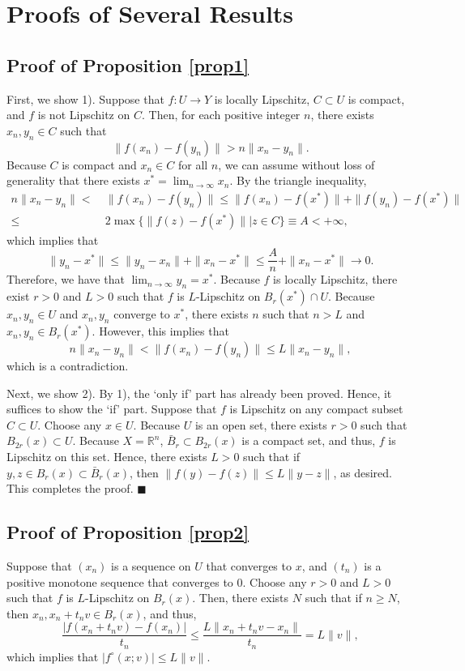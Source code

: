 \documentclass[a4paper,12pt]{article}
\theoremstyle{definition}
\begin{document}
\appendix
\section{Proofs of Several Results}


\subsection{Proof of Proposition \ref{prop1}}
First, we show 1). Suppose that $f:U\to Y$ is locally Lipschitz, $C\subset U$ is compact, and $f$ is not Lipschitz on $C$. Then, for each positive integer $n$, there exists $x_n,y_n\in C$ such that
\[\|f(x_n)-f(y_n)\|>n\|x_n-y_n\|.\]
Because $C$ is compact and $x_n\in C$ for all $n$, we can assume without loss of generality that there exists $x^*=\lim_{n\to \infty}x_n$. By the triangle inequality,
\begin{align*}
n\|x_n-y_n\|<&~\|f(x_n)-f(y_n)\|\le \|f(x_n)-f(x^*)\|+\|f(y_n)-f(x^*)\|\\
\le&~2\max\{\|f(z)-f(x^*)\||z\in C\}\equiv A<+\infty,
\end{align*}
which implies that
\[\|y_n-x^*\|\le \|y_n-x_n\|+\|x_n-x^*\|\le \frac{A}{n}+\|x_n-x^*\|\to 0.\]
Therefore, we have that $\lim_{n\to \infty}y_n=x^*$. Because $f$ is locally Lipschitz, there exist $r>0$ and $L>0$ such that $f$ is $L$-Lipschitz on $B_r(x^*)\cap U$. Because $x_n,y_n\in U$ and $x_n,y_n$ converge to $x^*$, there exists $n$ such that $n>L$ and $x_n,y_n\in B_r(x^*)$. However, this implies that
\[n\|x_n-y_n\|<\|f(x_n)-f(y_n)\|\le L\|x_n-y_n\|,\]
which is a contradiction. 

Next, we show 2). By 1), the `only if' part has already been proved. Hence, it suffices to show the `if' part. Suppose that $f$ is Lipschitz on any compact subset $C\subset U$. Choose any $x\in U$. Because $U$ is an open set, there exists $r>0$ such that $B_{2r}(x)\subset U$. Because $X=\mathbb{R}^n$, $\bar{B}_r\subset B_{2r}(x)$ is a compact set, and thus, $f$ is Lipschitz on this set. Hence, there exists $L>0$ such that if $y,z\in B_r(x)\subset \bar{B}_r(x)$, then $\|f(y)-f(z)\|\le L\|y-z\|$, as desired. This completes the proof. $\blacksquare$


\subsection{Proof of Proposition \ref{prop2}}
Suppose that $(x_n)$ is a sequence on $U$ that converges to $x$, and $(t_n)$ is a positive monotone sequence that converges to $0$. Choose any $r>0$ and $L>0$ such that $f$ is $L$-Lipschitz on $B_r(x)$. Then, there exists $N$ such that if $n\ge N$, then $x_n,x_n+t_nv\in B_r(x)$, and thus,
\[\frac{|f(x_n+t_nv)-f(x_n)|}{t_n}\le \frac{L\|x_n+t_nv-x_n\|}{t_n}=L\|v\|,\]
which implies that $|f^{\circ}(x;v)|\le L\|v\|$.
\end{document}
